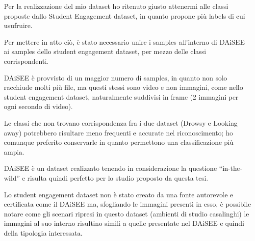 Per la realizzazione del mio dataset ho ritenuto giusto attenermi alle classi proposte dallo Student Engagement dataset, in quanto propone più labels di cui usufruire.

Per mettere in atto ciò, è stato necessario unire i samples all’interno di DAiSEE ai samples dello student engagement dataset, per mezzo delle classi corrispondenti.

DAiSEE è provvisto di un maggior numero di samples, in quanto non solo racchiude molti più file, ma questi stessi sono video e non immagini, come nello student engagement dataset, naturalmente suddivisi in frame (2 immagini per ogni secondo di video).

Le classi che non trovano corrispondenza fra i due dataset (Drowsy e Looking away) potrebbero risultare meno frequenti e accurate nel riconoscimento; ho comunque preferito conservarle in quanto permettono una classificazione più ampia.

DAiSEE è un dataset realizzato tenendo in considerazione la questione “in-the-wild” e risulta quindi perfetto per lo studio proposto da questa tesi.

Lo student engagement dataset non è stato creato da una fonte autorevole e certificata come il DAiSEE ma, sfogliando le immagini presenti in esso, è possibile notare come gli scenari ripresi in questo dataset (ambienti di studio casalinghi) le immagini al suo interno risultino simili a quelle presentate nel DAiSEE e quindi della tipologia interessata.


